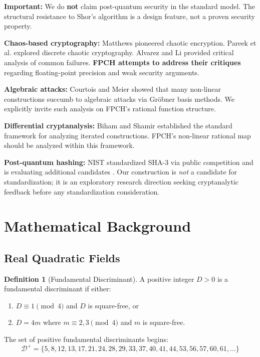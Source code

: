 \documentclass[11pt,a4paper]{article}
\theoremstyle{plain}
\theoremstyle{definition}
\newtheorem{definition}{Definition}[section]
\theoremstyle{remark}
\begin{document}
\textbf{Important:} We do \textbf{not} claim post-quantum security in the standard model. The structural resistance to Shor's algorithm is a design feature, not a proven security property.

\textbf{Chaos-based cryptography:} Matthews \cite{matthews1989} pioneered chaotic encryption. Pareek et al. \cite{pareek2003} explored discrete chaotic cryptography. Alvarez and Li \cite{alvarez2006} provided critical analysis of common failures. \textbf{FPCH attempts to address their critiques} regarding floating-point precision and weak security arguments.

\textbf{Algebraic attacks:} Courtois and Meier \cite{courtois2003} showed that many non-linear constructions succumb to algebraic attacks via Gr\"obner basis methods. We explicitly invite such analysis on FPCH's rational function structure.

\textbf{Differential cryptanalysis:} Biham and Shamir \cite{biham1991} established the standard framework for analyzing iterated constructions. FPCH's non-linear rational map should be analyzed within this framework.

\textbf{Post-quantum hashing:} NIST standardized SHA-3 \cite{nist2015} via public competition and is evaluating additional candidates \cite{nist2024}. Our construction is \textit{not} a candidate for standardization; it is an exploratory research direction seeking cryptanalytic feedback before any standardization consideration.

\section{Mathematical Background}

\subsection{Real Quadratic Fields}

\begin{definition}[Fundamental Discriminant]\label{def:disc}
A positive integer $D > 0$ is a fundamental discriminant if either:
\begin{enumerate}
    \item $D \equiv 1 \pmod{4}$ and $D$ is square-free, or
    \item $D = 4m$ where $m \equiv 2,3 \pmod{4}$ and $m$ is square-free.
\end{enumerate}
The set of positive fundamental discriminants begins:
\begin{equation}
\mathcal{D}^+ = \{5, 8, 12, 13, 17, 21, 24, 28, 29, 33, 37, 40, 41, 44, 53, 56, 57, 60, 61, \ldots\}
\end{equation}
\end{definition}
\end{document}
